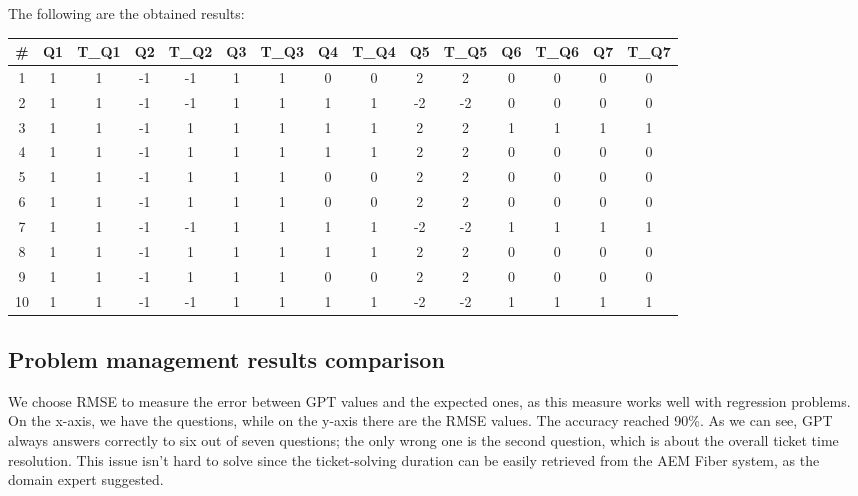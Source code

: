 The following are the obtained results:
\begin{center}
      \begin{tabular}{ccccccccccccccc}
            \toprule
            \# & Q1 & T\_Q1 & Q2 & T\_Q2 & Q3 & T\_Q3 & Q4 & T\_Q4 & Q5 & T\_Q5 & Q6 & T\_Q6 & Q7 & T\_Q7 \\
            \midrule
            1  & 1  & 1     & -1 & -1    & 1  & 1     & 0  & 0     & 2  & 2     & 0  & 0     & 0  & 0     \\
            2  & 1  & 1     & -1 & -1    & 1  & 1     & 1  & 1     & -2 & -2    & 0  & 0     & 0  & 0     \\
            3  & 1  & 1     & -1 & 1     & 1  & 1     & 1  & 1     & 2  & 2     & 1  & 1     & 1  & 1     \\
            4  & 1  & 1     & -1 & 1     & 1  & 1     & 1  & 1     & 2  & 2     & 0  & 0     & 0  & 0     \\
            5  & 1  & 1     & -1 & 1     & 1  & 1     & 0  & 0     & 2  & 2     & 0  & 0     & 0  & 0     \\
            6  & 1  & 1     & -1 & 1     & 1  & 1     & 0  & 0     & 2  & 2     & 0  & 0     & 0  & 0     \\
            7  & 1  & 1     & -1 & -1    & 1  & 1     & 1  & 1     & -2 & -2    & 1  & 1     & 1  & 1     \\
            8  & 1  & 1     & -1 & 1     & 1  & 1     & 1  & 1     & 2  & 2     & 0  & 0     & 0  & 0     \\
            9  & 1  & 1     & -1 & 1     & 1  & 1     & 0  & 0     & 2  & 2     & 0  & 0     & 0  & 0     \\
            10 & 1  & 1     & -1 & -1    & 1  & 1     & 1  & 1     & -2 & -2    & 1  & 1     & 1  & 1     \\
            \bottomrule
      \end{tabular}
\end{center}


\subsection{Problem management results comparison}

We choose RMSE to measure the error between GPT values and the expected ones, as this measure works well with regression problems. On the x-axis, we have the questions, while on the y-axis there are the RMSE values. The accuracy reached 90\%. As we can see, GPT always answers correctly to six out of seven questions; the only wrong one is the second question, which is about the overall ticket time resolution. This issue isn't hard to solve since the ticket-solving duration can be easily retrieved from the AEM Fiber system, as the domain expert suggested.


